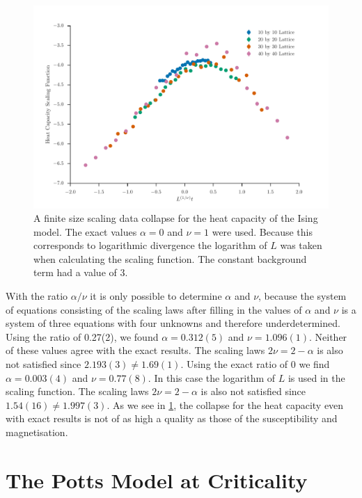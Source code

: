 \documentclass[11pt, a4paper]{report} %
\begin{document}
\begin{figure}[htb]
	\includegraphics[width=\linewidth]{ising_heat_capacity_data_collapse.pdf}
	\caption{A finite size scaling data collapse for the heat capacity of the Ising model. The exact values \(\alpha=0\) and \(\nu=1\) were used. Because this corresponds to logarithmic divergence the logarithm of \(L\) was taken when calculating the scaling function. The constant background term had a value of 3.}
	\label{fig:ising_heat_capacity_collapse}
\end{figure}

With the ratio \(\alpha / \nu\) it is only possible to determine \(\alpha\) and \(\nu\), because the system of equations consisting of the scaling laws after filling in the values of \(\alpha\) and \(\nu\) is a system of three equations with four unknowns and therefore underdetermined.
Using the ratio of 0.27(2), we found \(\alpha=0.312(5)\) and \(\nu=1.096(1)\).
Neither of these values agree with the exact results.
The scaling laws \(2\nu = 2-\alpha\) is also not satisfied since \(2.193(3) \neq 1.69(1)\).
Using the exact ratio of 0 we find \(\alpha=0.003(4)\) and \(\nu=0.77(8)\).
In this case the logarithm of \(L\) is used in the scaling function.
The scaling laws \(2\nu = 2-\alpha\) is also not satisfied since \(1.54(16) \neq 1.997(3)\).
As we see in \cref{fig:ising_heat_capacity_collapse}, the collapse for the heat capacity even with exact results is not of as high a quality as those of the susceptibility and magnetisation.


\section{The Potts Model at Criticality}
\end{document}

